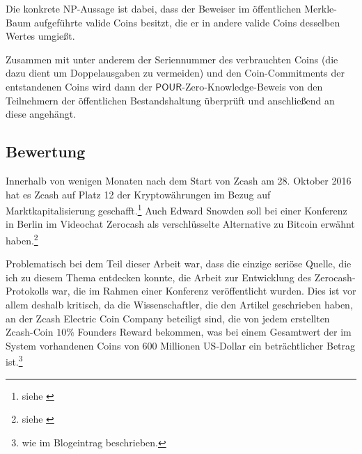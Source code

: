 Die konkrete NP-Aussage ist dabei, dass der Beweiser im öffentlichen Merkle-Baum aufgeführte valide Coins besitzt, die er in andere valide Coins desselben Wertes umgießt.

Zusammen mit unter anderem der Seriennummer des verbrauchten Coins (die dazu dient um Doppelausgaben zu vermeiden) und den Coin-Commitments der entstandenen Coins wird dann der \( \textsf{POUR} \)-Zero-Knowledge-Beweis von den Teilnehmern der öffentlichen Bestandshaltung überprüft und anschließend an diese angehängt.

\subsection{Bewertung}
Innerhalb von wenigen Monaten nach dem Start von Zcash am 28. Oktober 2016 hat es Zcash auf Platz 12 der Kryptowährungen im Bezug auf Marktkapitalisierung geschafft.\footnote{siehe \cite{cryptocurrencymarketcapitalizations}} Auch Edward Snowden soll bei einer Konferenz in Berlin im Videochat Zerocash als verschlüsselte Alternative zu Bitcoin erwähnt haben.\footnote{siehe \cite{snowdenzcash}}

Problematisch bei dem Teil dieser Arbeit war, dass die einzige seriöse Quelle, die ich zu diesem Thema entdecken konnte, die Arbeit zur Entwicklung des Zerocash-Protokolls war, die im Rahmen einer Konferenz veröffentlicht wurden. Dies ist vor allem deshalb kritisch, da die Wissenschaftler, die den Artikel geschrieben haben, an der Zcash Electric Coin Company beteiligt sind, die von jedem erstellten Zcash-Coin \( 10 \% \) \glqq{}Founders Reward\grqq{} bekommen, was bei einem Gesamtwert der im System vorhandenen Coins von 600 Millionen US-Dollar ein beträchtlicher Betrag ist.\footnote{wie im Blogeintrag \cite{zcashfunding} beschrieben.}

\pagebreak
